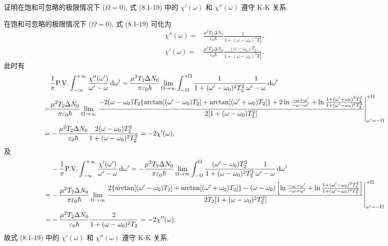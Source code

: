 \documentclass[twoside]{note}
\begin{document}
\begin{exe}
    证明在饱和可忽略的极限情况下 ($\Omega=0$), 式 (8.1-19) 中的 $\chi'(\omega)$ 和 $\chi''(\omega)$ 遵守 K-K 关系.
\end{exe}
\begin{pf}
    在饱和可忽略的极限情况下 ($\Omega=0$), 式 (8.1-19) 可化为
    \begin{align}
        \chi''(\omega)=&\frac{\mu^2T_2\Delta N_0}{\varepsilon_0\hbar}\frac{1}{1+(\omega-\omega_0)^2T_2^2},\\
        \chi'(\omega)=&\frac{\mu^2T_2\Delta N_0}{\varepsilon_0\hbar}\frac{(\omega-\omega_0)T_2}{1+(\omega-\omega_0)^2T_2^2}.
    \end{align}
    此时有
    \begin{align}
        \notag&\frac{1}{\pi}\text{P.V.}\int_{-\infty}^{+\infty}\frac{\chi''(\omega')}{\omega'-\omega}\,\mathrm{d}\omega'=\frac{\mu^2T_2\Delta N_0}{\pi\varepsilon_0\hbar}\lim_{\Omega\rightarrow\infty}\int_{-\Omega}^{+\Omega}\frac{1}{1+(\omega'-\omega_0)^2T_2^2}\frac{1}{\omega'-\omega}\,\mathrm{d}\omega'\\
        \notag=&\frac{\mu^2T_2\Delta N_0}{\pi\varepsilon_0\hbar}\lim_{\Omega\rightarrow\infty}\left.\frac{-2(\omega-\omega_0)T_2\{\arctan[(\omega'-\omega_0)T_2]+\arctan[(\omega'+\omega_0)T_2]\}+2\ln\frac{-\omega+\omega'}{-\omega-\omega'}+\ln\frac{1+(\omega'+\omega_0)^2T_2^2}{1+(\omega'-\omega_0)^2T_2^2}}{2[1+(\omega-\omega_0)T_2^2]}\right|_{\omega'=-\Omega}^{+\Omega}\\
        =&-\frac{\mu^2T_2\Delta N_0}{\varepsilon_0\hbar}\frac{2(\omega-\omega_0)T_2^2}{1+(\omega-\omega_0)^2T_2^2}=-2\chi'(\omega),
    \end{align}
    及
    \begin{align}
        \notag&-\frac{1}{\pi}\text{P.V.}\int_{-\infty}^{+\infty}\frac{\chi'(\omega')}{\omega'-\omega}\,\mathrm{d}\omega'=-\frac{\mu^2T_2\Delta N_0}{\pi\varepsilon_0\hbar}\lim_{\Omega\rightarrow\infty}\int_{-\Omega}^{\Omega}\frac{(\omega'-\omega_0)T_2^2}{1+(\omega-\omega_0)^2T_2^2}\frac{1}{\omega'-\omega}\,\mathrm{d}\omega'\\
        \notag=&-\frac{\mu^2T_2\Delta N_0}{\pi\varepsilon_0\hbar}\lim_{\Omega\rightarrow\infty}\left.\frac{2\{\arctan[(\omega'-\omega_0)T_2]+\arctan[(\omega'+\omega_0)T_2]\}-(\omega-\omega_0)\left[\ln\frac{-\omega-\omega'}{-\omega+\omega'}+\ln\frac{1+(\omega'-\omega_0)^2T_2^2}{1+(\omega'-\omega_0)^2T_2^2}\right]}{2T_2[1+(\omega-\omega_0)^2T_2^2]}\right|_{\omega'=-\Omega}^{+\Omega}\\
        =&-\frac{\mu^2T_2\Delta N_0}{\varepsilon_0\hbar}\frac{2}{1+(\omega-\omega_0)^2T_2}=-2\chi''(\omega).
    \end{align}
    故式 (8.1-19) 中的 $\chi'(\omega)$ 和 $\chi''(\omega)$ 遵守 K-K 关系.
\end{pf}
\ifx\allfiles\undefined
\end{document}
